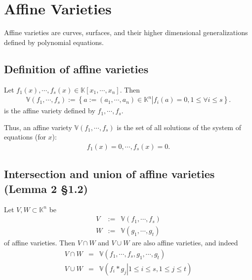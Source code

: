 \documentclass[11pt]{book}
\begin{document}

\section{Affine Varieties}
Affine varieties are curves, surfaces, and their higher dimensional generalizations defined by polynomial equations.

\subsection{Definition of affine varieties}
\label{DefOfAV}
Let $f_1(x), \cdots, f_s(x) \in \mathbb{K}[x_1,\cdots,x_n]$.
Then
\begin{eqnarray}
\mathbb{V}(f_1, \cdots, f_s) := \left\{\left. a := (a_1, \cdots, a_n) \in \mathbb{K}^n \right| f_i(a) = 0, 1 \leq \forall i \leq s \right\}.
\end{eqnarray}
is the affine variety defined by $f_1, \cdots, f_s$.

Thus, an affine variety $\mathbb{V}(f_1, \cdots, f_s)$ is the set of all solutions of the system of equations (for $x$):
\begin{eqnarray}
f_1(x) =0, \cdots, f_s(x) =0.
\end{eqnarray}

\subsection{Intersection and union of affine varieties (Lemma 2 \S1.2)}
\label{intersectionAndUnionOfVarieties}
Let $V, W \subset \mathbb{K}^n$ be 
\begin{eqnarray}
V &:=& \mathbb{V}(f_1, \cdots, f_s)\\
W &:=& \mathbb{V}(g_1, \cdots, g_t)
\end{eqnarray}
of affine varieties.
Then $V \cap W$ and $V \cup W$ are also affine varieties, and indeed
\begin{eqnarray}
V \cap W &=& \mathbb{V}(f_1, \cdots, f_s, g_1, \cdots, g_t) \\
V \cup W &=& \mathbb{V}\left( \left. f_i * g_j \right| 1 \leq i \leq s, 1 \leq j \leq t \right) 
\end{eqnarray}
\end{document}
